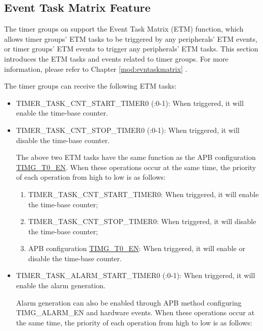 \documentclass[main\_\_EN.tex]{subfiles}
\begin{document}
\subsection{Event Task Matrix Feature} \label{sec:timg-etm-func}

The timer groups on \chipname{} support the Event Task Matrix (ETM) function, which allows timer groups' ETM tasks to be triggered by any peripherals' ETM events, or timer groups' ETM events to trigger any peripherals' ETM tasks. This section introduces the ETM tasks and events related to timer groups. For more information, please refer to Chapter \ref{mod:evntaskmatrix} .

The timer groups can receive the following ETM tasks:

\begin{itemize}

\item TIMER\_TASK\_CNT\_START\_TIMER0 (:0-1): When triggered, it will enable the time-base counter.
\item TIMER\_TASK\_CNT\_STOP\_TIMER0 (:0-1): When triggered, it will disable the time-base counter.

\begin{tiplisting}
The above two ETM tasks have the same function as the APB configuration \hyperref[fielddesc:TIMGTXEN]{TIMG\_T0\_EN}. When these operations occur at the same time, the priority of each operation from high to low is as follows:

\begin{enumerate}
    \item TIMER\_TASK\_CNT\_START\_TIMER0: When triggered, it will enable the time-base counter;
    \item TIMER\_TASK\_CNT\_STOP\_TIMER0: When triggered, it will disable the time-base counter;
    \item APB configuration \hyperref[fielddesc:TIMGTXEN]{TIMG\_T0\_EN}: When triggered, it will enable or disable the time-base counter.
\end{enumerate}
\end{tiplisting}

\item TIMER\_TASK\_ALARM\_START\_TIMER0 (:0-1): When triggered, it will enable the alarm generation.

\begin{tiplisting}
Alarm generation can also be enabled through APB method configuring TIMG\_ALARM\_EN and hardware events. When these operations occur at the same time, the priority of each operation from high to low is as follows:


\end{tiplisting}
\end{itemize}
\end{document}
